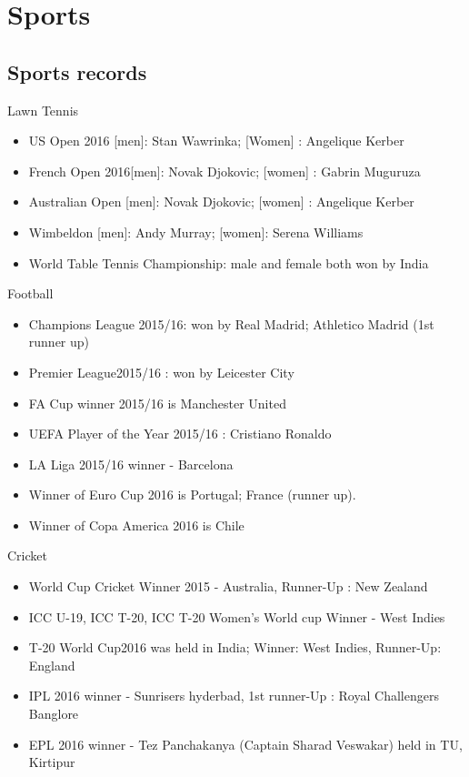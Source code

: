 \documentclass[
  openany]{book}
\providecommand{\tightlist}{%
  \setlength{\itemsep}{0pt}\setlength{\parskip}{0pt}}
\begin{document}
\hypertarget{sports}{%
\chapter{Sports}\label{sports}}

\hypertarget{sports-records}{%
\section{Sports records}\label{sports-records}}

Lawn Tennis

\begin{itemize}
\tightlist
\item
  US Open 2016 {[}men{]}: Stan Wawrinka; {[}Women{]} : Angelique Kerber
\item
  French Open 2016{[}men{]}: Novak Djokovic; {[}women{]} : Gabrin Muguruza
\item
  Australian Open {[}men{]}: Novak Djokovic; {[}women{]} : Angelique Kerber
\item
  Wimbeldon {[}men{]}: Andy Murray; {[}women{]}: Serena Williams\\
\item
  World Table Tennis Championship: male and female both won by India
\end{itemize}

Football

\begin{itemize}
\tightlist
\item
  Champions League 2015/16: won by Real Madrid; Athletico Madrid (1st runner up)
\item
  Premier League2015/16 : won by Leicester City
\item
  FA Cup winner 2015/16 is Manchester United
\item
  UEFA Player of the Year 2015/16 : Cristiano Ronaldo
\item
  LA Liga 2015/16 winner - Barcelona
\item
  Winner of Euro Cup 2016 is Portugal; France (runner up).
\item
  Winner of Copa America 2016 is Chile
\end{itemize}

Cricket

\begin{itemize}
\tightlist
\item
  World Cup Cricket Winner 2015 - Australia, Runner-Up : New Zealand
\item
  ICC U-19, ICC T-20, ICC T-20 Women's World cup Winner - West Indies
\item
  T-20 World Cup2016 was held in India; Winner: West Indies, Runner-Up: England
\item
  IPL 2016 winner - Sunrisers hyderbad, 1st runner-Up : Royal Challengers Banglore
\item
  EPL 2016 winner - Tez Panchakanya (Captain Sharad Veswakar) held in TU, Kirtipur
\end{itemize}
\end{document}
